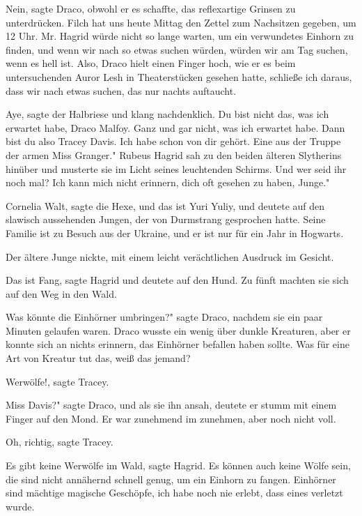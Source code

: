 \glqq{}Nein\grqq{}, sagte Draco, obwohl er es schaffte, das reflexartige Grinsen
zu unterdrücken. \glqq{}Filch hat uns heute Mittag den Zettel zum
Nachsitzen gegeben, um 12 Uhr. Mr. Hagrid würde nicht so lange warten, um
ein verwundetes Einhorn zu finden, und wenn wir nach so etwas suchen
würden, würden wir am Tag suchen, wenn es hell ist. Also\grqq{}, Draco
hielt einen Finger hoch, wie er es beim untersuchenden Auror Lesh in
Theaterstücken gesehen hatte, \glqq{}schließe ich daraus, dass wir nach
etwas suchen, das nur nachts auftaucht.\grqq{}

\glqq{}Aye\grqq{}, sagte der Halbriese und klang nachdenklich. \glqq{}Du bist
nicht das, was ich erwartet habe, Draco Malfoy. Ganz und gar nicht, was
ich erwartet habe. Dann bist du also Tracey Davis. Ich habe schon von dir
gehört. Eine aus der Truppe der armen Miss Granger." Rubeus Hagrid sah zu
den beiden älteren Slytherins hinüber und musterte sie im Licht seines
leuchtenden Schirms. \glqq{}Und wer seid ihr noch mal? Ich kann mich nicht
erinnern, dich oft gesehen zu haben, Junge."

\glqq{}Cornelia Walt\grqq{}, sagte die Hexe, \glqq{}und das ist Yuri Yuliy\grqq{},
und deutete auf den slawisch aussehenden Jungen, der von Durmstrang
gesprochen hatte. \glqq{}Seine Familie ist zu Besuch aus der Ukraine, und
er ist nur für ein Jahr in Hogwarts.\grqq{}

Der ältere Junge nickte, mit einem leicht verächtlichen Ausdruck im Gesicht.

\glqq{}Das ist Fang\grqq{}, sagte Hagrid und deutete auf den Hund. Zu fünft
machten sie sich auf den Weg in den Wald.

\glqq{}Was könnte die Einhörner umbringen?" sagte Draco, nachdem sie ein paar
Minuten gelaufen waren. Draco wusste ein wenig über dunkle Kreaturen,
aber er konnte sich an nichts erinnern, das Einhörner befallen haben
sollte. \glqq{}Was für eine Art von Kreatur tut das, weiß das
jemand?\grqq{}

\glqq{}Werwölfe!\grqq{}, sagte Tracey.

\glqq{}Miss Davis?" sagte Draco, und als sie ihn ansah, deutete er stumm mit
einem Finger auf den Mond. Er war zunehmend im zunehmen, aber noch nicht
voll.

\glqq{}Oh, richtig\grqq{}, sagte Tracey.

\glqq{}Es gibt keine Werwölfe im Wald\grqq{}, sagte Hagrid. \glqq{}Es können auch
keine Wölfe sein, die sind nicht annähernd schnell genug, um ein Einhorn
zu fangen. Einhörner sind mächtige magische Geschöpfe, ich habe noch nie
erlebt, dass eines verletzt wurde.\grqq{}

